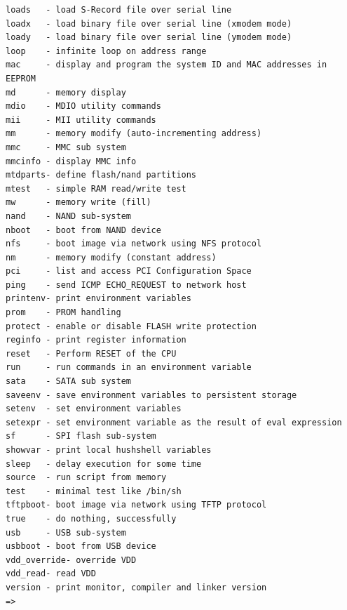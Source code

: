 \documentclass[11pt
  , a4paper
  , article
  , oneside
  , showtrims
]{memoir}
\begin{document}
\begin{lstlisting}[style=termstyle]
loads   - load S-Record file over serial line
loadx   - load binary file over serial line (xmodem mode)
loady   - load binary file over serial line (ymodem mode)
loop    - infinite loop on address range
mac     - display and program the system ID and MAC addresses in EEPROM
md      - memory display
mdio    - MDIO utility commands
mii     - MII utility commands
mm      - memory modify (auto-incrementing address)
mmc     - MMC sub system
mmcinfo - display MMC info
mtdparts- define flash/nand partitions
mtest   - simple RAM read/write test
mw      - memory write (fill)
nand    - NAND sub-system
nboot   - boot from NAND device
nfs     - boot image via network using NFS protocol
nm      - memory modify (constant address)
pci     - list and access PCI Configuration Space
ping    - send ICMP ECHO_REQUEST to network host
printenv- print environment variables
prom    - PROM handling
protect - enable or disable FLASH write protection
reginfo - print register information
reset   - Perform RESET of the CPU
run     - run commands in an environment variable
sata    - SATA sub system
saveenv - save environment variables to persistent storage
setenv  - set environment variables
setexpr - set environment variable as the result of eval expression
sf      - SPI flash sub-system
showvar - print local hushshell variables
sleep   - delay execution for some time
source  - run script from memory
test    - minimal test like /bin/sh
tftpboot- boot image via network using TFTP protocol
true    - do nothing, successfully
usb     - USB sub-system
usbboot - boot from USB device
vdd_override- override VDD
vdd_read- read VDD
version - print monitor, compiler and linker version
=>
\end{lstlisting}
\end{document}

